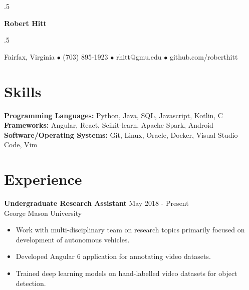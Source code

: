 \documentclass[11pt]{res} %
\begin{document}

\moveleft.5\hoffset\centerline{\large\bf Robert Hitt} %

\moveleft.5\hoffset\centerline{Fairfax, Virginia  $\bullet$  (703) 895-1923  $\bullet$  rhitt@gmu.edu  $\bullet$  github.com/roberthitt}

\vspace{-15pt}
\noindent\makebox[\linewidth]{\rule{\textwidth}{1pt}}


\begin{resume}


\vspace{-26pt}\section{\LARGE Skills} \smallskip

\textbf{Programming Languages:} Python, Java, SQL, Javascript, Kotlin, C \smallskip\\
\textbf{Frameworks:} Angular, React, Scikit-learn, Apache Spark, Android \smallskip\\
\textbf{Software/Operating Systems:} Git, Linux, Oracle, Docker, Visual Studio Code, Vim

\vspace{-15pt}
\noindent\makebox[\linewidth]{\rule{\textwidth}{1pt}}


\vspace{-10pt}\section{\LARGE\bf Experience} \smallskip

\textbf{Undergraduate Research Assistant} \hfill May 2018 - Present \\
George Mason University\smallskip
\begin{itemize}
\item Work with multi-disciplinary team on research topics primarily focused on development of autonomous vehicles.
\item Developed Angular 6 application for annotating video datasets.
\item Trained deep learning models on hand-labelled video datasets for object detection.
\end{itemize}


\end{resume}
\end{document}
